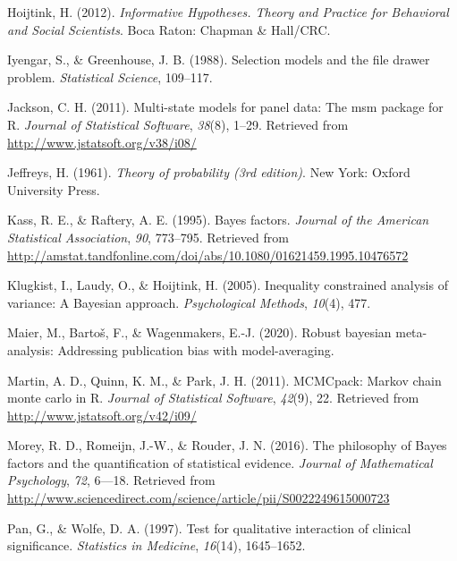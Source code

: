 \documentclass[english,,man]{apa6}
\begin{document}
\leavevmode\hypertarget{ref-Hoijtink:2012}{}%
Hoijtink, H. (2012). \emph{Informative Hypotheses. Theory and Practice for Behavioral and Social Scientists}. Boca Raton: Chapman \& Hall/CRC.

\leavevmode\hypertarget{ref-Iyengar:Greenhouse:1988}{}%
Iyengar, S., \& Greenhouse, J. B. (1988). Selection models and the file drawer problem. \emph{Statistical Science}, 109--117.

\leavevmode\hypertarget{ref-R-msm}{}%
Jackson, C. H. (2011). Multi-state models for panel data: The msm package for R. \emph{Journal of Statistical Software}, \emph{38}(8), 1--29. Retrieved from \url{http://www.jstatsoft.org/v38/i08/}

\leavevmode\hypertarget{ref-Jeffreys:1961}{}%
Jeffreys, H. (1961). \emph{Theory of probability (3rd edition)}. New York: Oxford University Press.

\leavevmode\hypertarget{ref-Kass:Raftery:1995}{}%
Kass, R. E., \& Raftery, A. E. (1995). Bayes factors. \emph{Journal of the American Statistical Association}, \emph{90}, 773--795. Retrieved from \url{http://amstat.tandfonline.com/doi/abs/10.1080/01621459.1995.10476572}

\leavevmode\hypertarget{ref-Klugkist:etal:2005}{}%
Klugkist, I., Laudy, O., \& Hoijtink, H. (2005). Inequality constrained analysis of variance: A Bayesian approach. \emph{Psychological Methods}, \emph{10}(4), 477.

\leavevmode\hypertarget{ref-Maier:etal:2020}{}%
Maier, M., Bartoš, F., \& Wagenmakers, E.-J. (2020). Robust bayesian meta-analysis: Addressing publication bias with model-averaging.

\leavevmode\hypertarget{ref-R-MCMCpack}{}%
Martin, A. D., Quinn, K. M., \& Park, J. H. (2011). MCMCpack: Markov chain monte carlo in R. \emph{Journal of Statistical Software}, \emph{42}(9), 22. Retrieved from \url{http://www.jstatsoft.org/v42/i09/}

\leavevmode\hypertarget{ref-Morey:etal:2016}{}%
Morey, R. D., Romeijn, J.-W., \& Rouder, J. N. (2016). The philosophy of Bayes factors and the quantification of statistical evidence. \emph{Journal of Mathematical Psychology}, \emph{72}, 6---18. Retrieved from \url{http://www.sciencedirect.com/science/article/pii/S0022249615000723}

\leavevmode\hypertarget{ref-Pan:Wolfe:1997}{}%
Pan, G., \& Wolfe, D. A. (1997). Test for qualitative interaction of clinical significance. \emph{Statistics in Medicine}, \emph{16}(14), 1645--1652.
\end{document}
